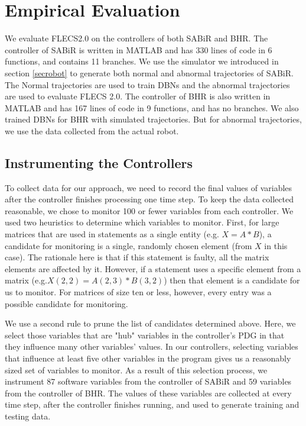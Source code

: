 \section{Empirical Evaluation}
We evaluate FLECS2.0 on the controllers of both SABiR and BHR. The controller of SABiR is written in MATLAB and has 330 lines of code in 6 functions, and contains 11 branches. We use the simulator we introduced in section \ref{secrobot} to generate both normal and abnormal trajectories of SABiR. The Normal trajectories are used to train DBNs and the abnormal trajectories are used to evaluate FLECS 2.0. The controller of BHR is also written in MATLAB and has 167 lines of code in 9 functions, and has no branches. We also trained DBNs for BHR with simulated trajectories. But for abnormal trajectories, we use the data collected from the actual robot.

\subsection{Instrumenting the Controllers}
To collect data for our approach, we need to record the final values of variables after the controller finishes processing one time step. To keep the data collected reasonable, we chose to monitor 100 or fewer variables from each controller. We used two heuristics to determine which variables to monitor. First, for large matrices that are used in statements as a single entity (e.g. $X = A*B$), a candidate for monitoring is a single, randomly chosen element (from $X$ in this case). The rationale here is that if this statement is faulty, all the matrix elements are affected by it. However, if a statement uses a specific element from a matrix (e.g.$X(2, 2) = A(2, 3) * B(3, 2)$) then that element is a candidate for us to monitor. For matrices of size ten or less, however, every entry was a possible candidate for monitoring.

We use a second rule to prune the list of candidates determined above. Here, we select those variables that are "hub" variables in the controller’s PDG in that they influence many other variables' values. In our controllers, selecting variables that influence at least five other variables in the program gives us a reasonably sized set of variables to monitor. As a result of this selection process, we instrument 87 software variables from the controller of SABiR and 59 variables from the controller of BHR. The values of these variables are collected at every time step, after the controller finishes running, and used to generate training and testing data.

